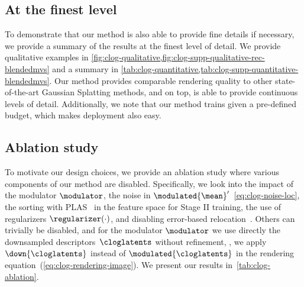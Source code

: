   \subsection{At the finest level}
    To demonstrate that our method is also able to provide fine details if
    necessary, we provide a summary of the results at the finest level of detail.
    We provide qualitative examples in
    \cref{fig:clog-qualitative,fig:clog-supp-qualitative-rec-blendedmvs} and a
    summary in \cref{tab:clog-quantitative,tab:clog-supp-quantitative-blendedmvs}.
    Our method provides comparable rendering quality to other state-of-the-art
    Gaussian Splatting methods, and on top, is able to provide continuous levels
    of detail.
    Additionally, we note that our method trains given a pre-defined budget, which
    makes deployment also easy.


  \subsection{Ablation study}
    To motivate our design choices, we provide an ablation study where various
    components of our method are disabled.
    Specifically, we look into the impact of the modulator $\modulator$, the noise
    in $\modulated{\mean}'$~\cref{eq:clog-noise-loc}, the sorting with
    PLAS~\cite{morgenstern2024compact} in the feature space for Stage II training,
    the use of regularizers $\regularizer(\cdot)$, and disabling error-based
    relocation~\cite{bulo2024revising}.
    Others can trivially be disabled, and for the modulator $\modulator$ we use
    directly the downsampled descriptors~$\cloglatents$ without refinement, \ie,
    we apply $\down{\cloglatents}$ instead of $\modulated{\cloglatents}$ in the
    rendering equation~(\cref{eq:clog-rendering-image}).
    We present our results in~\cref{tab:clog-ablation}.
